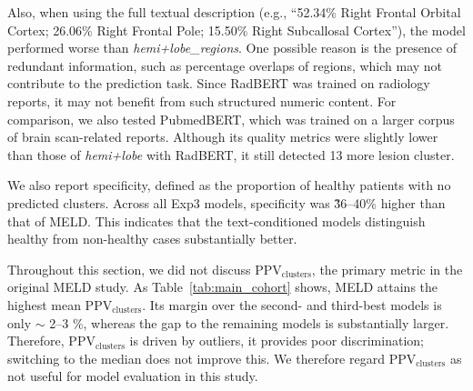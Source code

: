 \documentclass[a4paper,12pt]{article}
\begin{document}
Also, when using the full textual description (e.g., ``52.34\% Right Frontal Orbital Cortex; 26.06\% Right Frontal Pole; 15.50\% Right Subcallosal Cortex''), the model performed worse than \textit{hemi+lobe\_regions}. One possible reason is the presence of redundant information, such as percentage overlaps of regions, which may not contribute to the prediction task. Since RadBERT was trained on radiology reports, it may not benefit from such structured numeric content. For comparison, we also tested PubmedBERT, which was trained on a larger corpus of brain scan-related reports. Although its quality metrics were slightly lower than those of \textit{hemi+lobe} with RadBERT, it still detected 13 more lesion cluster. 

We also report specificity, defined as the proportion of healthy patients with no predicted clusters. Across all Exp3 models, specificity was \~36–40\% higher than that of MELD. This indicates that the text-conditioned models distinguish healthy from non-healthy cases substantially better.

Throughout this section, we did not discuss PPV$_{\text{clusters}}$, the primary metric in the original MELD study. As Table~\ref{tab:main_cohort} shows, MELD attains the highest mean PPV$_{\text{clusters}}$. Its margin over the second- and third-best models is only $\sim$ 2--3 \%, whereas the gap to the remaining models is substantially larger.
Therefore, PPV$_{\text{clusters}}$ is driven by outliers, it provides poor discrimination; switching to the median does not improve this. We therefore regard PPV$_{\text{clusters}}$ as not useful for model evaluation in this study.
\end{document}
